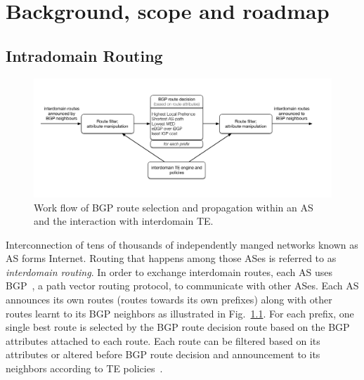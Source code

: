 \chapter{Background, scope and roadmap}
\section{Intradomain Routing}
\begin{figure}[!htb]
\centering
\includegraphics[width=1.3\textwidth]{gfx/chap1/bgp_decision.pdf}
\caption{Work flow of \acf{BGP} route selection and propagation within an \acf{AS} and the interaction with interdomain \acf{TE}.}
\label{fig:bgp_decision}
\end{figure}

Interconnection of tens of thousands of independently manged networks known as \acf{AS} forms Internet.
Routing that happens among those ASes is referred to as 
\textit{interdomain routing}.
In order to exchange interdomain routes, each AS uses \acf{BGP}~\cite{bgp4}, a path vector routing protocol, to communicate with other ASes.
Each AS announces its own routes (routes towards its own prefixes) along with other routes learnt to its BGP neighbors as illustrated in Fig.~\ref{fig:bgp_decision}.
For each prefix, one single best route is selected by the BGP route decision route based on the BGP attributes attached to each route.
Each route can be filtered based on its attributes or altered before BGP route decision and announcement to its neighbors according to \acf{TE} policies~\cite{Quoitin2003, Gao2001a}.

